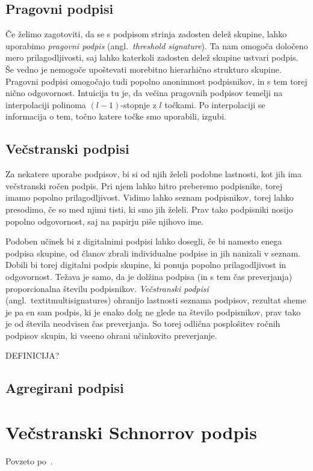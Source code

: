 \documentclass[isrm2, tisk]{fmfdelo}
\begin{document}
\subsection{Pragovni podpisi}
Če želimo zagotoviti, da se s podpisom strinja zadosten delež skupine, lahko uporabimo \textit{pragovni 
podpis} (angl.\ \textit{threshold signature}). Ta nam omogoča določeno mero prilagodljivosti, saj lahko 
katerkoli zadosten delež skupine ustvari podpis. Še vedno je nemogoče upoštevati morebitno hierarhično
strukturo skupine. Pragovni podpisi omogočajo tudi popolno anonimnost podpisnikov, in s tem torej 
nično odgovornost. Intuicija tu je, da večina pragovnih podpisov temelji na interpolaciji polinoma 
$(l - 1)$-stopnje z $l$ točkami. Po interpolaciji se informacija o tem, točno katere točke smo uporabili, 
izgubi.

\subsection{Večstranski podpisi}
Za nekatere uporabe podpisov, bi si od njih želeli podobne lastnosti, kot jih ima večstranski ročen podpis. 
Pri njem lahko hitro preberemo podpisnike, torej imamo popolno prilagodljivost. Vidimo lahko seznam 
podpisnikov, torej lahko presodimo, če so med njimi tisti, ki smo jih želeli. Prav tako podpisniki nosijo 
popolno odgovornost, saj na papirju piše njihovo ime. 

Podoben učinek bi z digitalnimi podpisi lahko dosegli, če bi namesto enega podpisa skupine, od članov 
zbrali individualne podpise in jih nanizali v seznam. Dobili bi torej digitalni podpis skupine, ki 
ponuja popolno prilagodljivost in odgovornost. Težava je samo, da je dolžina podpisa (in s tem čas 
preverjanja) proporcionalna številu podpisnikov. \textit{Večstranski podpisi} (angl.\ textit{multisignatures})
ohranijo lastnosti seznama podpisov, rezultat sheme je pa en sam podpis, ki je enako dolg ne glede 
na število podpisnikov, prav tako je od števila neodvisen čas preverjanja. So torej odlična posplošitev 
ročnih podpisov skupin, ki vseeno ohrani učinkovito preverjanje.

DEFINICIJA?

\subsection{Agregirani podpisi}

\section{Večstranski Schnorrov podpis}
Povzeto po~\cite{micali2001asm}.
\end{document}
